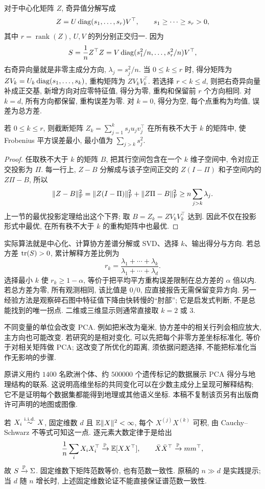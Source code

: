 对于中心化矩阵 $Z$, 奇异值分解写成
\[
 Z=U\operatorname{diag}(s_1,\ldots,s_r)V^\top,
 \qquad s_1\geq\cdots\geq s_r>0,
\]
其中 $r=\operatorname{rank}(Z)$, $U,V$ 的列分别正交归一. 因为
\[
 S=\frac1n Z^\top Z
   =V\operatorname{diag}(s_1^2/n,\ldots,s_r^2/n)V^\top,
\]
右奇异向量就是非零主成分方向, $\lambda_j=s_j^2/n$. 当 $0\leq k\leq r$ 时, 得分矩阵为 $ZV_k=U_k\operatorname{diag}(s_1,\ldots,s_k)$, 重构矩阵为 $ZV_kV_k^\top$. 若选择 $r<k\leq d$, 则把右奇异向量补成正交基, 新增方向对应零特征值, 得分为零, 重构和保留前 $r$ 个方向相同. 对 $k=d$, 所有方向都保留, 重构误差为零. 对 $k=0$, 得分为空, 每个点重构为均值, 误差为总方差. 

\begin{proposition}
若 $0\leq k\leq r$, 则截断矩阵 $Z_k=\sum_{j=1}^k s_ju_jv_j^\top$ 在所有秩不大于 $k$ 的矩阵中, 使 Frobenius 平方误差最小, 最小值为 $\sum_{j>k}s_j^2$. 
\end{proposition}
\begin{proof}
任取秩不大于 $k$ 的矩阵 $B$, 把其行空间包含在一个 $k$ 维子空间中, 令对应正交投影为 $\Pi$. 每一行上, $Z-B$ 分解成与该子空间正交的 $Z(I-\Pi)$ 和子空间内的 $Z\Pi-B$, 所以
\[
 \lVert Z-B\rVert_{\mathrm F}^2
 =\lVert Z(I-\Pi)\rVert_{\mathrm F}^2+\lVert Z\Pi-B\rVert_{\mathrm F}^2
 \geq n\sum_{j>k}\lambda_j.
\]
上一节的最优投影定理给出这个下界; 取 $B=Z_k=ZV_kV_k^\top$ 达到. 因此不仅在投影形式中最优, 在所有秩不大于 $k$ 的重构矩阵中也最优. 
\end{proof}
实际算法就是中心化、计算协方差谱分解或 SVD、选择 $k$、输出得分与方向. 若总方差 $\operatorname{tr}(S)>0$, 累计解释方差比例为
\[
 r_k=\frac{\lambda_1+\cdots+\lambda_k}{\lambda_1+\cdots+\lambda_d}.
\]
选择最小 $k$ 使 $r_k\geq1-\alpha$, 等价于把平均平方重构误差限制在总方差的 $\alpha$ 倍以内. 若总方差为零, 所有观测相同, 该比值是 $0/0$, 应直接报告无需保留变异方向. 另一经验方法是观察碎石图中特征值下降由快转慢的“肘部”; 它是启发式判断, 不是总能找到的唯一拐点. 二维或三维显示则通常直接取 $k=2$ 或 $3$. 

不同变量的单位会改变 PCA. 例如把米改为毫米, 协方差中的相关行列会相应放大, 主方向也可能改变. 若研究的是相对变化, 可以先把每个非零方差坐标标准化, 等价于对相关矩阵做 PCA; 这改变了所优化的距离, 须依据问题选择, 不能把标准化当作无影响的步骤. 

原讲义用约 $1400$ 名欧洲个体、约 $500000$ 个遗传标记的数据展示 PCA 得分与地理结构的联系. 这说明高维坐标的共同变化可以在少数主成分上呈现可解释结构; 它不是证明每个数据集都能得到地理或其他语义坐标. 本稿不复制该页另有出版商许可声明的地图或图像. 

若 $X_i\stackrel{\mathrm{i.i.d.}}{\sim} X$, 固定维数 $d$ 且 $\mathbb E\lVert X\rVert^2<\infty$, 每个 $X^{(j)}X^{(k)}$ 可积, 由 Cauchy--Schwarz 不等式可知这一点. 逐元素大数定律于是给出
\[
 \frac1n\sum_iX_iX_i^\top\xrightarrow{\mathbb P}\mathbb E[XX^\top],\qquad
 \bar X\bar X^\top\xrightarrow{\mathbb P} mm^\top,
\]
故 $S\xrightarrow{\mathbb P}\Sigma$. 固定维数下矩阵范数等价, 也有范数一致性. 原稿的 $n\gg d$ 是实践提示; 当 $d$ 随 $n$ 增长时, 上述固定维数论证不能直接保证谱范数一致性. 

